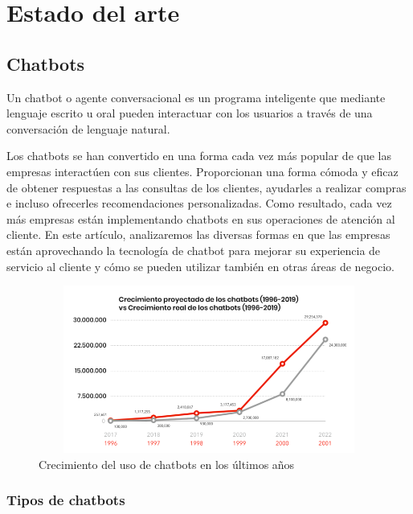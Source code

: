 \chapter{Estado del arte}

\section{Chatbots}

Un chatbot o agente conversacional es un programa inteligente que mediante lenguaje escrito u oral pueden interactuar con los usuarios a través de una conversación de lenguaje natural. 

Los chatbots se han convertido en una forma cada vez más popular de que las empresas interactúen con sus clientes. Proporcionan una forma cómoda y eficaz de obtener respuestas a las consultas de los clientes, ayudarles a realizar compras e incluso ofrecerles recomendaciones personalizadas. Como resultado, cada vez más empresas están implementando chatbots en sus operaciones de atención al cliente. En este artículo, analizaremos las diversas formas en que las empresas están aprovechando la tecnología de chatbot para mejorar su experiencia de servicio al cliente y cómo se pueden utilizar también en otras áreas de negocio.

\begin{figure}[!ht]
    \centering
    \includegraphics[width=1\textwidth, height=5.5cm]{imagenes/uso_chatbots.png}
    \caption{ Crecimiento del uso de chatbots en los últimos años }
    \label{fig:enter-label}
\end{figure}

\subsection{Tipos de chatbots}

